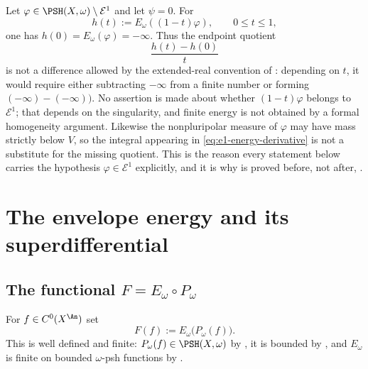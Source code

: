 \begin{example}
\label{ex:ch27-outside-e1}
Let \(\varphi\in\PSH(X,\omega)\setminus\mathcal E^1\) and let \(\psi=0\).
For
\[
                 h(t):=E_\omega((1-t)\varphi),\qquad0\leq t\leq1,
\]
one has \(h(0)=E_\omega(\varphi)=-\infty\).  Thus the endpoint quotient
\[
                    \frac{h(t)-h(0)}{t}
\]
is not a difference allowed by the extended-real convention of
: depending on \(t\), it would require either
subtracting \(-\infty\) from a finite number or forming
\((-\infty)-(-\infty))\).  No assertion is made about whether
\((1-t)\varphi\) belongs to \(\mathcal E^1\); that depends on the
singularity, and finite energy is not obtained by a formal homogeneity
argument.  Likewise the nonpluripolar measure of \(\varphi\) may have mass
strictly below \(V\), so the integral appearing in
\eqref{eq:e1-energy-derivative} is not a substitute for the missing
quotient.  This is the reason every statement below carries the hypothesis
\(\varphi\in\mathcal E^1\) explicitly, and it is why
 is proved before, not after,
.
\end{example}

\section{The envelope energy and its superdifferential}
\label{sec:ch27-superdifferential}

\subsection{The functional \texorpdfstring{\(F=E_\omega\circ P_\omega\)}{F}}
\label{sec:ch27-F-elementary}

\begin{definition}
\label{def:ch27-envelope-energy}
For \(f\in C^0(X^{\An})\) set
\begin{equation}\label{eq:ch27-F-definition}
 F(f):=E_\omega\bigl(P_\omega(f)\bigr).
\end{equation}
This is well defined and finite: \(P_\omega(f)\in\PSH(X,\omega)\) by
, it is bounded by
, and \(E_\omega\) is finite on bounded
\(\omega\)-psh functions by .
\end{definition}

